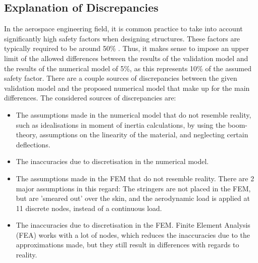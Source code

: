 \subsection{Explanation of Discrepancies}
In the aerospace engineering field, it is common practice to take into account significantly high safety factors when designing structures. These factors are typically required to be around 50\% \cite{safety_factors}. Thus, it makes sense to impose an upper limit of the allowed differences between the results of the validation model and the results of the numerical model of 5\%, as this represents 10\% of the assumed safety factor. There are a couple sources of discrepancies between the given validation model and the proposed numerical model that make up for the main differences. The considered sources of discrepancies are:

\begin{itemize}
    \item The assumptions made in the numerical model that do not resemble reality, such as idealisations in moment of inertia calculations, by using the boom-theory, assumptions on the linearity of the material, and neglecting certain deflections.
    \item The inaccuracies due to discretisation in the numerical model.
    \item The assumptions made in the FEM that do not resemble reality. There are 2 major assumptions in this regard: The stringers are not placed in the FEM, but are 'smeared out' over the skin, and the aerodynamic load is applied at 11 discrete nodes, instead of a continuous load.
    \item The inaccuracies due to discretisation in the FEM. Finite Element Analysis (FEA) works with a lot of nodes, which reduces the inaccuracies due to the approximations made, but they still result in differences with regards to reality.
\end{itemize}



